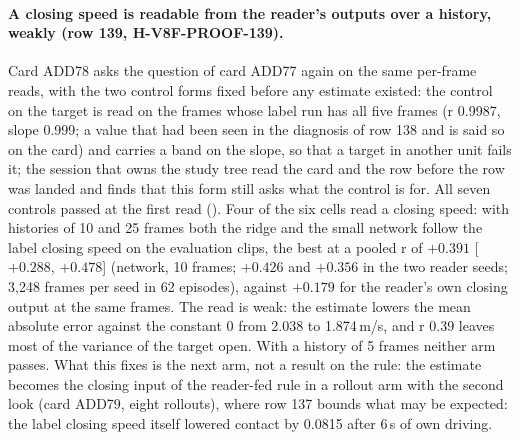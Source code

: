 \paragraph{A closing speed is readable from the reader's outputs over a history, weakly (row 139, H-V8F-PROOF-139).} Card ADD78 asks the question of card ADD77 again on the same per-frame reads, with the two control forms fixed before any estimate existed: the control on the target is read on the frames whose label run has all five frames (r 0.9987, slope 0.999; a value that had been seen in the diagnosis of row 138 and is said so on the card) and carries a band on the slope, so that a target in another unit fails it; the session that owns the study tree read the card and the row before the row was landed and finds that this form still asks what the control is for. All seven controls passed at the first read (). Four of the six cells read a closing speed: with histories of 10 and 25 frames both the ridge and the small network follow the label closing speed on the evaluation clips, the best at a pooled r of $+0.391$ [$+0.288$, $+0.478$] (network, 10 frames; $+0.426$ and $+0.356$ in the two reader seeds; 3,248 frames per seed in 62 episodes), against $+0.179$ for the reader's own closing output at the same frames. The read is weak: the estimate lowers the mean absolute error against the constant 0 from 2.038 to 1.874\,m/s, and r 0.39 leaves most of the variance of the target open. With a history of 5 frames neither arm passes. What this fixes is the next arm, not a result on the rule: the estimate becomes the closing input of the reader-fed rule in a rollout arm with the second look (card ADD79, eight rollouts), where row 137 bounds what may be expected: the label closing speed itself lowered contact by 0.0815 after 6\,s of own driving.

